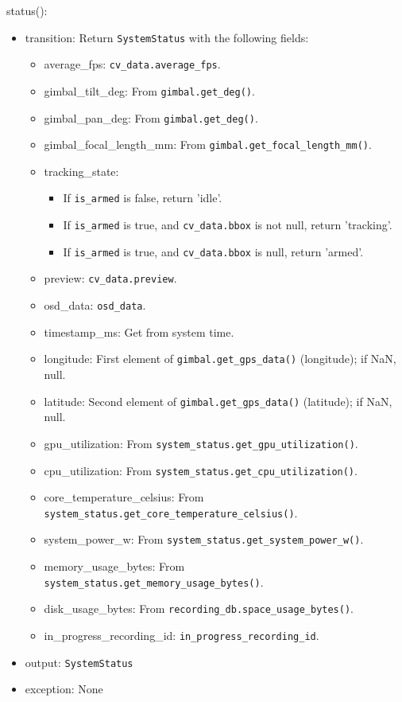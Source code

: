 \documentclass[12pt, titlepage]{article}
\begin{document}
\noindent status():
\begin{itemize}
  \item transition: Return \texttt{SystemStatus} with the following fields:
        \begin{itemize}
          \item average\_fps: \texttt{cv\_data.average\_fps}.
          \item gimbal\_tilt\_deg: From \texttt{gimbal.get\_deg()}.
          \item gimbal\_pan\_deg: From \texttt{gimbal.get\_deg()}.
          \item gimbal\_focal\_length\_mm: From \texttt{gimbal.get\_focal\_length\_mm()}.
          \item tracking\_state:
                \begin{itemize}
                  \item If \texttt{is\_armed} is false, return 'idle'.
                  \item If \texttt{is\_armed} is true, and \texttt{cv\_data.bbox} is not null, return
                        'tracking'.
                  \item If \texttt{is\_armed} is true, and \texttt{cv\_data.bbox} is null, return
                        'armed'.
                \end{itemize}
          \item preview: \texttt{cv\_data.preview}.
          \item osd\_data: \texttt{osd\_data}.
          \item timestamp\_ms: Get from system time.
          \item longitude: First element of \texttt{gimbal.get\_gps\_data()} (longitude); if
                NaN, null.
          \item latitude: Second element of \texttt{gimbal.get\_gps\_data()} (latitude); if
                NaN, null.
          \item gpu\_utilization: From \texttt{system\_status.get\_gpu\_utilization()}.
          \item cpu\_utilization: From \texttt{system\_status.get\_cpu\_utilization()}.
          \item core\_temperature\_celsius: From
                \texttt{system\_status.get\_core\_temperature\_celsius()}.
          \item system\_power\_w: From \texttt{system\_status.get\_system\_power\_w()}.
          \item memory\_usage\_bytes: From \texttt{system\_status.get\_memory\_usage\_bytes()}.
          \item disk\_usage\_bytes: From \texttt{recording\_db.space\_usage\_bytes()}.
          \item in\_progress\_recording\_id: \texttt{in\_progress\_recording\_id}.
        \end{itemize}
  \item output: \texttt{SystemStatus}
  \item exception: None
\end{itemize}
\end{document}
